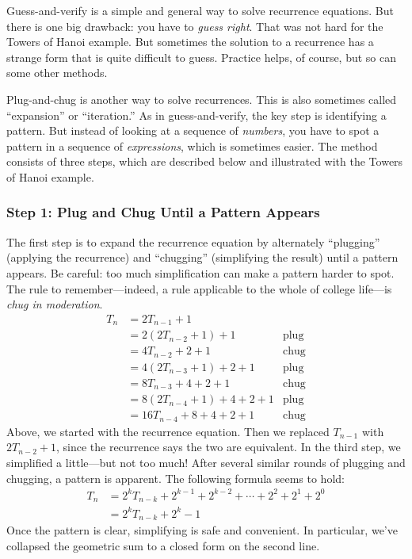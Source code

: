 Guess-and-verify is a simple and general way to solve recurrence
equations.  But there is one big drawback: you have to \emph{guess
  right}.  That was not hard for the Towers of Hanoi example.  But
sometimes the solution to a recurrence has a strange form that is
quite difficult to guess.  Practice helps, of course, but so can some
other methods.

Plug-and-chug is another way to solve recurrences.  This is also
sometimes called ``expansion'' or ``iteration.''  As in
guess-and-verify, the key step is identifying a pattern.  But instead
of looking at a sequence of \emph{numbers}, you have to spot a pattern
in a sequence of \emph{expressions}, which is sometimes easier.  The
method consists of three steps, which are described below and
illustrated with the Towers of Hanoi example.

\subsubsection*{Step 1: Plug and Chug Until a Pattern Appears}

The first step is to expand the recurrence equation by alternately
``plugging'' (applying the recurrence) and ``chugging'' (simplifying the
result) until a pattern appears.  Be careful: too much simplification
can make a pattern harder to spot.  The rule to remember---indeed, a
rule applicable to the whole of college life---is \emph{chug in
  moderation}.
\begin{align*}
T_n & = 2T_{n-1} + 1 \\
  & = 2 (2 T_{n-2} + 1)  + 1 & \text{plug} \\
  & = 4 T_{n-2} + 2 + 1 & \text{chug} \\
  & = 4 (2 T_{n-3} + 1) + 2 + 1 & \text{plug} \\
  & = 8 T_{n-3} + 4 + 2 + 1 & \text{chug} \\
  & = 8 (2 T_{n-4} + 1) + 4 + 2 + 1 & \text{plug} \\
  & = 16 T_{n-4} + 8 + 4 + 2 + 1 & \text{chug}
\end{align*}
Above, we started with the recurrence equation.  Then we replaced
$T_{n-1}$ with $2 T_{n-2} + 1$, since the recurrence says the two are
equivalent.  In the third step, we simplified a little---but not too
much!  After several similar rounds of plugging and chugging, a
pattern is apparent.  The following formula seems to hold:
\begin{align*}
T_n & = 2^k T_{n - k} + 2^{k-1} + 2^{k-2} + \cdots + 2^2 + 2^1 + 2^0 \\
  & = 2^k T_{n-k} + 2^k - 1
\end{align*}
Once the pattern is clear, simplifying is safe and convenient.  In
particular, we've collapsed the geometric sum to a closed form on the
second line.

